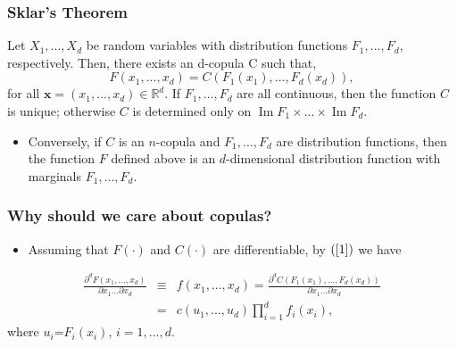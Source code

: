 \documentclass[pdf,9pt,xcolor=dvipsnames,hide notes]{beamer}
\DeclareMathOperator{\Ima}{Im}
\begin{document}
		\begin{frame}[label=frame1c2]
	\frametitle{Sklar's Theorem}
	
\begin{theorem}
	Let $X_{1},...,X_{d}$ be random variables with distribution functions $F_{1},...,F_{d}$, respectively. Then, there exists an d-copula C such that,
	\begin{equation}
	F\left( x_{1},...,x_{d}\right) =C\left( F_{1}\left( x_{1}\right)
	,...,F_{d}\left( x_{d}\right) \right) ,  \label{1} 
	\end{equation}
\noindent for all $\mathbf{x}=\left( x_{1},...,x_{d}\right) \in
\mathbb{R}^{d}$. If $F_{1},...,F_{d}$ are all continuous, then the function $C$ is unique; otherwise $C$ is determined only on $\Ima F_{1}\times ...\times \Ima F_{d}$. 
\end{theorem}

\begin{itemize}
	\item Conversely, if $C$ is an $n$-copula and $F_{1},...,F_{d}$ are distribution functions, then the function $F$ defined above is an $d$-dimensional distribution function with marginals $F_{1},...,F_{d}$.
\end{itemize}

\end{frame}

\begin{frame}[label=frame2]
\frametitle{Why should we care about copulas?}

	\begin{itemize}
		\justifying
		
		\item Assuming that $F\left( \cdot \right) $ and $C\left( \cdot
		\right) $ are differentiable, by $\left( \ref{1}\right)$ we have
		
	\end{itemize}
	
	\begin{eqnarray}
	\frac{\partial ^{d}F\left( x_{1},...,x_{d}\right) }{\partial
		x_{1}...\partial x_{d}} &\equiv &f\left( x_{1},...,x_{d}\right) =\frac{
		\partial ^{d}C\left( F_{1}\left( x_{1}\right) ,...,F_{d}\left( x_{d}\right)
		\right) }{\partial x_{1}...\partial x_{d}} \\
	&=&c\left( u_{1},...,u_{d}\right) \prod_{i=1}^{d}f_{i}\left( x_{i}\right),
	\label{23}
	\end{eqnarray}%
	where $u_{i}$=$F_{i}\left( x_{i}\right) $, $i=1,...,d$.
	
\end{frame}
\end{document}
